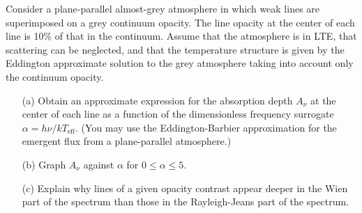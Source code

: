 \begin{problem}
Consider a plane-parallel almost-grey atmosphere in which weak lines are
superimposed on a grey continuum opacity. The line opacity at the center
of each line is 10\% of that in the continuum. Assume that the
atmosphere is in LTE, that scattering can be neglected, and that the temperature structure is given by the
Eddington approximate solution to the grey atmosphere taking into
account only the continuum opacity.

\begin{enumerate}
\item[(a)] Obtain an approximate expression for the absorption depth
  $A_\nu$ at the center of each line as a function of the dimensionless
  frequency surrogate $\alpha = h\nu/kT_\mathrm{eff}$. (You may use the
  Eddington-Barbier approximation for the emergent flux from a
  plane-parallel atmosphere.)

\item[(b)] Graph $A_\nu$ against $\alpha$ for $0 \le \alpha \le 5$.

\item[(c)] Explain why lines of a given opacity contrast appear deeper
  in the Wien part of the spectrum than those in the Rayleigh-Jeans part
  of the spectrum.
\end{enumerate}

\end{problem}

%


